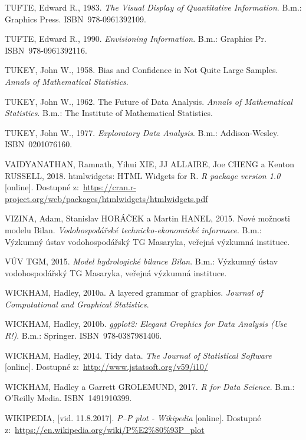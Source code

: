 \documentclass[12pt,]{article}
\begin{document}
\hypertarget{ref-tufte1983}{}
TUFTE, Edward R., 1983. \emph{The Visual Display of Quantitative
Information}. B.m.: Graphics Press. ISBN~978-0961392109.

\hypertarget{ref-tufte1990}{}
TUFTE, Edward R., 1990. \emph{Envisioning Information}. B.m.: Graphics
Pr. ISBN~978-0961392116.

\hypertarget{ref-jackknife_tukey}{}
TUKEY, John W., 1958. Bias and Confidence in Not Quite Large Samples.
\emph{Annals of Mathematical Statistics}.

\hypertarget{ref-tukey1962}{}
TUKEY, John W., 1962. The Future of Data Analysis. \emph{Annals of
Mathematical Statistics}. B.m.: The Institute of Mathematical
Statistics.

\hypertarget{ref-tukey1977}{}
TUKEY, John W., 1977. \emph{Exploratory Data Analysis}. B.m.:
Addison-Wesley. ISBN~0201076160.

\hypertarget{ref-htmlwidgets}{}
VAIDYANATHAN, Ramnath, Yihui XIE, JJ ALLAIRE, Joe CHENG a Kenton
RUSSELL, 2018. htmlwidgets: HTML Widgets for R. \emph{R package version
1.0} {[}online{]}. Dostupné
z:~\url{https://cran.r-project.org/web/packages/htmlwidgets/htmlwidgets.pdf}

\hypertarget{ref-bilan}{}
VIZINA, Adam, Stanislav HORÁČEK a Martin HANEL, 2015. Nové možnosti
modelu Bilan. \emph{Vodohospodářské technicko-ekonomické informace}.
B.m.: Výzkumný ústav vodohospodářský TG Masaryka, veřejná výzkumná
instituce.

\hypertarget{ref-bilan_man}{}
VÚV TGM, 2015. \emph{Model hydrologické bilance Bilan}. B.m.: Výzkumný
ústav vodohospodářský TG Masaryka, veřejná výzkumná instituce.

\hypertarget{ref-layered-grammar}{}
WICKHAM, Hadley, 2010a. A layered grammar of graphics. \emph{Journal of
Computational and Graphical Statistics}.

\hypertarget{ref-wickham_ggplot}{}
WICKHAM, Hadley, 2010b. \emph{ggplot2: Elegant Graphics for Data
Analysis (Use R!)}. B.m.: Springer. ISBN~978-0387981406.

\hypertarget{ref-tidydata}{}
WICKHAM, Hadley, 2014. Tidy data. \emph{The Journal of Statistical
Software} {[}online{]}. Dostupné
z:~\url{http://www.jstatsoft.org/v59/i10/}

\hypertarget{ref-grolemund_wickham2017}{}
WICKHAM, Hadley a Garrett GROLEMUND, 2017. \emph{R for Data Science}.
B.m.: O'Reilly Media. ISBN~1491910399.

\hypertarget{ref-pp_wiki}{}
WIKIPEDIA, {[}vid. 11.8.2017{]}. \emph{P--P plot - Wikipedia}
{[}online{]}. Dostupné
z:~\url{https://en.wikipedia.org/wiki/P\%E2\%80\%93P_plot}
\end{document}

